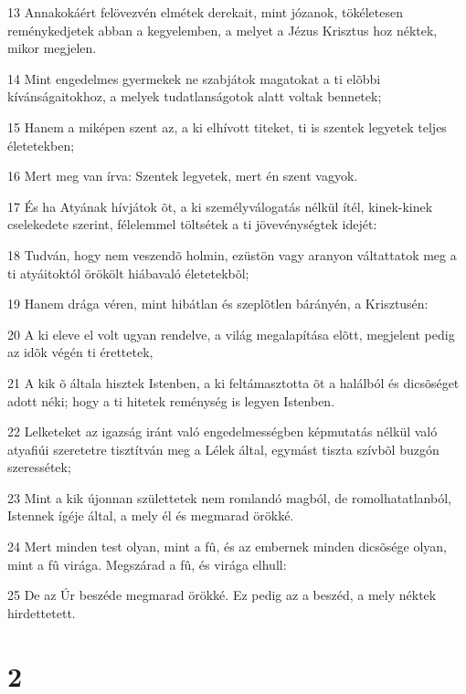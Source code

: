 \par 13 Annakokáért felövezvén elmétek derekait, mint józanok, tökéletesen reménykedjetek abban a kegyelemben, a melyet a Jézus Krisztus hoz néktek, mikor megjelen.
\par 14 Mint engedelmes gyermekek ne szabjátok magatokat a ti elõbbi kívánságaitokhoz, a melyek tudatlanságotok alatt voltak bennetek;
\par 15 Hanem a miképen szent az, a ki elhívott titeket, ti is szentek legyetek teljes életetekben;
\par 16 Mert meg van írva: Szentek legyetek, mert én szent vagyok.
\par 17 És ha Atyának hívjátok õt, a ki személyválogatás nélkül ítél, kinek-kinek cselekedete szerint, félelemmel töltsétek a ti jövevénységtek idejét:
\par 18 Tudván, hogy nem veszendõ holmin, ezüstön vagy aranyon váltattatok meg a ti atyáitoktól örökölt hiábavaló életetekbõl;
\par 19 Hanem drága véren, mint hibátlan és szeplõtlen bárányén, a Krisztusén:
\par 20 A ki eleve el volt ugyan rendelve, a világ megalapítása elõtt, megjelent pedig az idõk végén ti érettetek,
\par 21 A kik õ általa hisztek Istenben, a ki feltámasztotta õt a halálból és dicsõséget adott néki; hogy a ti hitetek reménység is legyen Istenben.
\par 22 Lelketeket az igazság iránt való engedelmességben képmutatás nélkül való atyafiúi szeretetre tisztítván meg a Lélek által, egymást tiszta szívbõl buzgón szeressétek;
\par 23 Mint a kik újonnan születtetek nem romlandó magból, de romolhatatlanból, Istennek ígéje által, a mely él és megmarad örökké.
\par 24 Mert minden test olyan, mint a fû, és az embernek minden dicsõsége olyan, mint a fû virága. Megszárad a fû, és virága elhull:
\par 25 De az Úr beszéde megmarad örökké. Ez pedig az a beszéd, a mely néktek hirdettetett.

\chapter{2}

